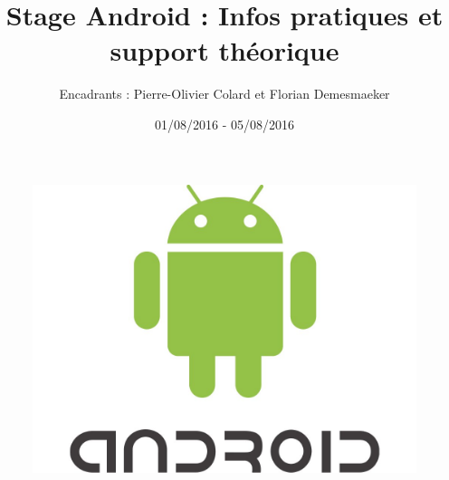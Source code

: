 \documentclass[12t,a4paper]{article}
\title{Stage Android : Infos pratiques et support théorique}
\author{Encadrants : Pierre-Olivier Colard et Florian Demesmaeker}
\date{01/08/2016 - 05/08/2016}
\begin{document}
\maketitle
\begin{center}
\begin{figure}[h!]
\includegraphics[width=1\linewidth]{android_logo.jpg}
\end{figure}
\end{center}

\vfill
\end{document}
